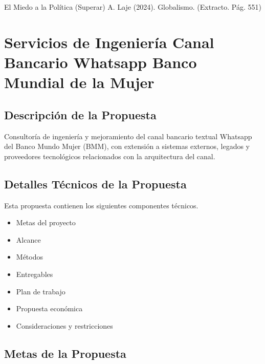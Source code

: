 \documentclass[
  paper=a4,
  ,captions=tableheading
]{scrartcl}
\providecommand{\tightlist}{%
  \setlength{\itemsep}{0pt}\setlength{\parskip}{0pt}}
\renewenvironment{quote}{\begin{customblockquote}\list{}{\rightmargin=0em\leftmargin=0em}%
\item\relax\color{blockquote-text}\ignorespaces}{\unskip\unskip\endlist\end{customblockquote}}
\begin{document}
El Miedo a la Política (Superar) A. Laje (2024). Globalismo. (Extracto.
Pág. 551)

\newpage

\section{Servicios de Ingeniería Canal Bancario Whatsapp Banco Mundial
de la
Mujer}\label{sec:servicios-de-ingenieruxeda-canal-bancario-whatsapp-banco-mundial-de-la-mujer}

\subsection{Descripción de la
Propuesta}\label{sec:descripciuxf3n-de-la-propuesta}

\begin{quote}
\end{quote}

Consultoría de ingeniería y mejoramiento del canal bancario textual
Whatsapp del Banco Mundo Mujer (BMM), con extensión a sistemas externos,
legados y proveedores tecnológicos relacionados con la arquitectura del
canal.

\subsection{Detalles Técnicos de la
Propuesta}\label{sec:detalles-tuxe9cnicos-de-la-propuesta}

\begin{quote}
\end{quote}

Esta propuesta contienen los siguientes componentes técnicos.

\begin{itemize}
\tightlist
\item
  Metas del proyecto
\item
  Alcance
\item
  Métodos
\item
  Entregables
\item
  Plan de trabajo
\item
  Propuesta económica
\item
  Consideraciones y restricciones
\end{itemize}

\subsection{Metas de la Propuesta}\label{sec:metas-de-la-propuesta}
\end{document}
